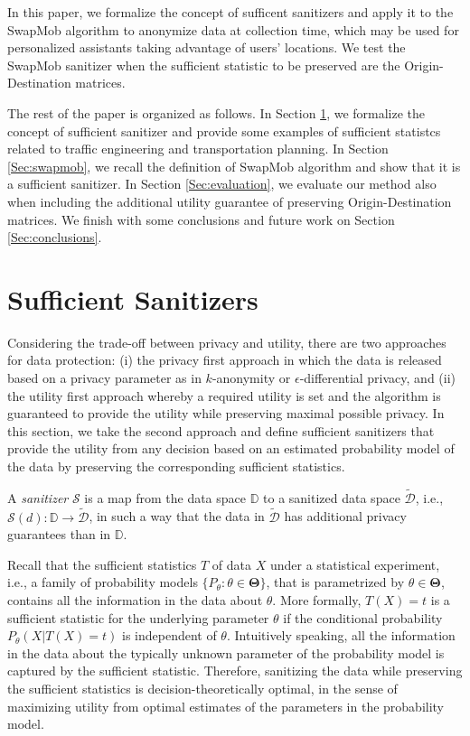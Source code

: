 \documentclass[times,twocolumn,final,authoryear]{elsarticle}
\begin{document}
In this paper, we formalize the concept of sufficent sanitizers and apply it to the SwapMob algorithm to anonymize data at collection time, which may be used for personalized assistants taking advantage of users' locations.
We test the SwapMob sanitizer when the sufficient statistic to be preserved are the Origin-Destination matrices.

  
The rest of the paper is organized as follows. In Section \ref{Sec:SufficientSanitizer}, we formalize the concept of sufficient sanitizer and provide some examples of sufficient statistcs related to traffic engineering and transportation planning. 
In Section \ref{Sec:swapmob}, 
we recall the definition of SwapMob algorithm and show that it is a sufficient sanitizer.
In Section \ref{Sec:evaluation}, we evaluate our method also when including the additional utility guarantee of preserving Origin-Destination matrices. 
We finish with some conclusions and future work on Section \ref{Sec:conclusions}.

\section{Sufficient Sanitizers}\label{Sec:SufficientSanitizer}

Considering the trade-off between privacy and utility, there are two approaches for data protection: 
(i) the privacy first approach in which the data is released based on a privacy parameter as in $k$-anonymity or $\epsilon$-differential privacy, and (ii) the utility first approach whereby a required utility is set and the algorithm is guaranteed to provide the utility while preserving maximal possible privacy.
In this section, we take the second approach and define sufficient sanitizers that provide the utility from any decision based on an estimated probability model of the data by preserving the corresponding sufficient statistics.


A {\em sanitizer} $\mathcal{S}$ is a map from the data space $\mathbb{D}$ to a sanitized data space $\tilde{\mathcal{D}}$, i.e., $\mathcal{S}(d): \mathbb{D} \to \tilde{\mathcal{D}}$, in such a way that the data in $\tilde{\mathcal{D}}$ has additional privacy guarantees than in $\mathbb{D}$.
 

Recall that the sufficient statistics $T$ of data $X$ under a statistical experiment, i.e., a family of probability models $\{P_{\theta}: \theta \in \mathbf{\Theta}\}$, that is parametrized by $\theta \in \mathbf{\Theta}$, contains all the information in the data about $\theta$.  
More formally, $T(X)=t$ is a sufficient statistic for the underlying parameter $\theta$ if the conditional probability $P_{\theta}(X | T(X)=t)$ is independent of $\theta$.  
Intuitively speaking, all the information in the data about the typically unknown parameter of the probability model is captured by the sufficient statistic.  
Therefore, sanitizing the data while preserving the sufficient statistics is decision-theoretically optimal, in the sense of maximizing utility from optimal estimates of the parameters in the probability model.
\end{document}
